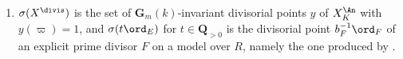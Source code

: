 \begin{theorem}
\begin{enumerate}
scaling-stable $\Omega\subset X^{\An}$, then $\sigma$ carries
$\operatorname{Link}_A(\Omega)$ homeomorphically onto a subset of
$X_K^{\An}$; but the images of the different links
$\operatorname{Link}_A(\Omega)$ and
$\operatorname{Link}_{cA}(\Omega)$, $c>0$, are disjoint unless
$c=1$, and no link is distinguished on the target.
\item\label{itm:ch32-gt:divisorial}
$\sigma(X^{\divis})$ is the set of $\mathbf G_m(k)$-invariant divisorial
points $y$ of $X_K^{\An}$ with $y(\varpi)=1$, and
$\sigma(t\ord_E)$ for $t\in\mathbf Q_{>0}$ is the divisorial point
$b_F^{-1}\ord_F$ of an explicit prime divisor $F$ on a model over $R$,
namely the one produced by .
\end{enumerate}
\end{theorem}

